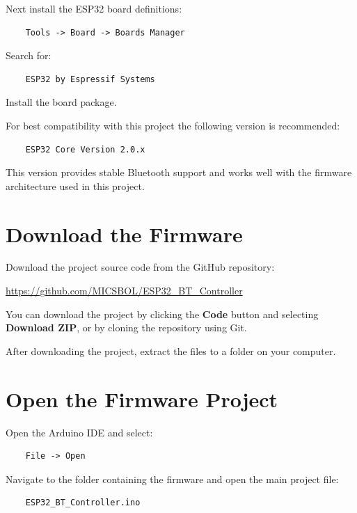 Next install the ESP32 board definitions:

\begin{verbatim}
	Tools -> Board -> Boards Manager
\end{verbatim}

Search for:

\begin{verbatim}
	ESP32 by Espressif Systems
\end{verbatim}

Install the board package.

For best compatibility with this project the following version is recommended:

\begin{verbatim}
	ESP32 Core Version 2.0.x
\end{verbatim}

This version provides stable Bluetooth support and works well with the firmware architecture used in this project.

\section{Download the Firmware}

Download the project source code from the GitHub repository:

\begin{center}
	\url{https://github.com/MICSBOL/ESP32_BT_Controller}
\end{center}

You can download the project by clicking the \textbf{Code} button and selecting \textbf{Download ZIP}, or by cloning the repository using Git.

After downloading the project, extract the files to a folder on your computer.

\section{Open the Firmware Project}

Open the Arduino IDE and select:

\begin{verbatim}
	File -> Open
\end{verbatim}

Navigate to the folder containing the firmware and open the main project file:

\begin{verbatim}
	ESP32_BT_Controller.ino
\end{verbatim}

